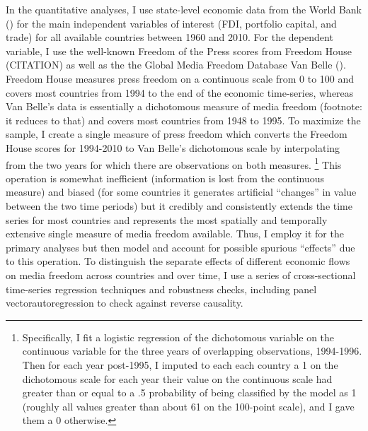 \documentclass[12pt]{report}
\begin{document}
In the quantitative analyses, I use state-level economic data from
the World Bank (\citeyear{WorldDevelopmentIn:2012wl}) for the main
independent variables of interest (FDI, portfolio capital, and trade)
for all available countries between 1960 and 2010. For the dependent
variable, I use the well-known Freedom of the Press scores from Freedom
House (CITATION) as well as the the Global Media Freedom Database
Van Belle (\citeyear{Belle:1997wo,van2000press}). Freedom House measures
press freedom on a continuous scale from 0 to 100 and covers most
countries from 1994 to the end of the economic time-series, whereas
Van Belle's data is essentially a dichotomous measure of media freedom
(footnote: it reduces to that) and covers most countries from 1948
to 1995. To maximize the sample, I create a single measure of press
freedom which converts the Freedom House scores for 1994-2010 to Van
Belle's dichotomous scale by interpolating from the two years for
which there are observations on both measures.%
\footnote{Specifically, I fit a logistic regression of the dichotomous variable
on the continuous variable for the three years of overlapping observations,
1994-1996. Then for each year post-1995, I imputed to each each country
a 1 on the dichotomous scale for each year their value on the continuous
scale had greater than or equal to a .5 probability of being classified
by the model as 1 (roughly all values greater than about 61 on the
100-point scale), and I gave them a 0 otherwise.%
} This operation is somewhat inefficient (information is lost from
the continuous measure) and biased (for some countries it generates
artificial ``changes'' in value between the two time periods) but
it credibly and consistently extends the time series for most countries
and represents the most spatially and temporally extensive single
measure of media freedom available. Thus, I employ it for the primary
analyses but then model and account for possible spurious ``effects''
due to this operation. To distinguish the separate effects of different
economic flows on media freedom across countries and over time, I
use a series of cross-sectional time-series regression techniques
and robustness checks, including panel vectorautoregression to check
against reverse causality.
\end{document}
